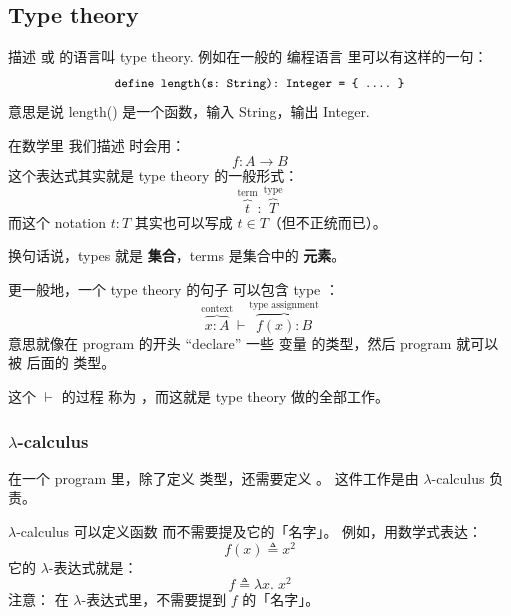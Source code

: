 \subsection{Type theory}

描述  或  的语言叫 type theory.  例如在一般的 编程语言 里可以有这样的一句：
\begin{equation}
\begin{small}
\verb!define length(s: String): Integer = { .... }!
\end{small}
\end{equation}
意思是说 length() 是一个函数，输入 String，输出 Integer.

在数学里 我们描述  时会用：
\begin{equation}
f: A \rightarrow B
\end{equation}
这个表达式其实就是 type theory 的一般形式：
\begin{equation}
\overbrace{t}^{\mbox{term}} : \overbrace{T}^{\mbox{type}}
\end{equation}
而这个 notation $t:T$ 其实也可以写成 $t \in T$（但不正统而已）。 

换句话说，types 就是 \textbf{集合}，terms 是集合中的 \textbf{元素}。 

更一般地，一个 type theory 的句子 可以包含 type ：
\begin{equation}
\overbrace{x : A}^{\mbox{context}} \vdash \overbrace{f(x) : B}^{\mbox{type assignment}}
\end{equation}
意思就像在 program 的开头 ``declare'' 一些 变量 的类型，然后 program 就可以被  后面的 类型。 

这个 $\vdash$ 的过程 称为 ，而这就是 type theory 做的全部工作。 

\subsubsection{$\lambda$-calculus}

在一个 program 里，除了定义 类型，还需要定义 。 这件工作是由 $\lambda$-calculus 负责。

$\lambda$-calculus 可以定义函数 而不需要提及它的「名字」。 例如，用数学式表达：
\begin{equation}
f(x) \triangleq x^2
\end{equation}
它的 $\lambda$-表达式就是：
\begin{equation}
f \triangleq \lambda x. \; x^2
\end{equation}
注意： 在 $\lambda$-表达式里，不需要提到 $f$ 的「名字」。


